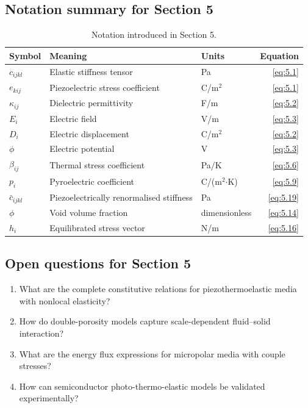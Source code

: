 \subsection{Notation summary for Section 5}

\begin{table}[htbp]
\centering
\small
\caption{Notation introduced in Section 5.}
\label{tab:notation-sec5}
\begin{tabularx}{\textwidth}{@{}lXlr@{}}
\toprule
\textbf{Symbol} & \textbf{Meaning} & \textbf{Units} & \textbf{Equation} \\
\midrule
$c_{ijkl}$ & Elastic stiffness tensor & Pa & \eqref{eq:5.1} \\
$e_{kij}$ & Piezoelectric stress coefficient & C/m$^2$ & \eqref{eq:5.1} \\
$\kappa_{ij}$ & Dielectric permittivity & F/m & \eqref{eq:5.2} \\
$E_i$ & Electric field & V/m & \eqref{eq:5.3} \\
$D_i$ & Electric displacement & C/m$^2$ & \eqref{eq:5.2} \\
$\phi$ & Electric potential & V & \eqref{eq:5.3} \\
$\beta_{ij}$ & Thermal stress coefficient & Pa/K & \eqref{eq:5.6} \\
$p_i$ & Pyroelectric coefficient & C/(m$^2$$\cdot$K) & \eqref{eq:5.9} \\
$\bar{c}_{ijkl}$ & Piezoelectrically renormalised stiffness & Pa & \eqref{eq:5.19} \\
$\phi$ & Void volume fraction & dimensionless & \eqref{eq:5.14} \\
$h_i$ & Equilibrated stress vector & N/m & \eqref{eq:5.16} \\
\bottomrule
\end{tabularx}
\end{table}

\subsection{Open questions for Section 5}

\begin{enumerate}[label=\textbf{OQ5.\arabic*}]
\item What are the complete constitutive relations for piezothermoelastic media with nonlocal elasticity? \\ \label{oq:5.1}
\item How do double-porosity models capture scale-dependent fluid--solid interaction? \\ \label{oq:5.2}
\item What are the energy flux expressions for micropolar media with couple stresses? \\ \label{oq:5.3}
\item How can semiconductor photo-thermo-elastic models be validated experimentally? \\ \label{oq:5.4}
\end{enumerate}

